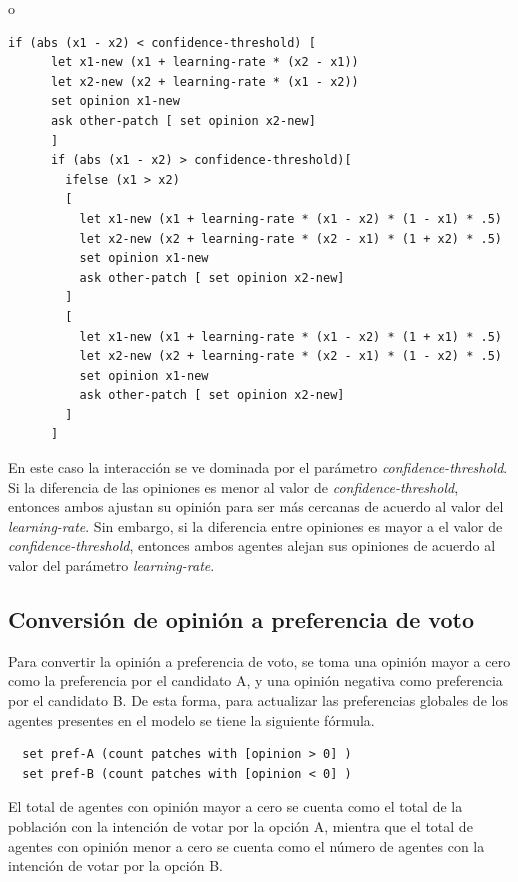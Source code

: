 o \documentclass[11pt, letterpaper]{article}
\begin{document}
\begin{verbatim}
if (abs (x1 - x2) < confidence-threshold) [ 
      let x1-new (x1 + learning-rate * (x2 - x1))
      let x2-new (x2 + learning-rate * (x1 - x2))
      set opinion x1-new
      ask other-patch [ set opinion x2-new]
      ]
      if (abs (x1 - x2) > confidence-threshold)[ 
        ifelse (x1 > x2)
        [
          let x1-new (x1 + learning-rate * (x1 - x2) * (1 - x1) * .5)
          let x2-new (x2 + learning-rate * (x2 - x1) * (1 + x2) * .5)
          set opinion x1-new
          ask other-patch [ set opinion x2-new]
        ]
        [
          let x1-new (x1 + learning-rate * (x1 - x2) * (1 + x1) * .5)
          let x2-new (x2 + learning-rate * (x2 - x1) * (1 - x2) * .5)
          set opinion x1-new
          ask other-patch [ set opinion x2-new]
        ]
      ]
\end{verbatim}

En este caso la interacción se ve dominada por el parámetro
\emph{confidence-threshold}. Si la diferencia de las opiniones es menor
al valor de \emph{confidence-threshold}, entonces ambos ajustan su
opinión para ser más cercanas de acuerdo al valor del
\emph{learning-rate}. Sin embargo, si la diferencia entre opiniones es
mayor a el valor de \emph{confidence-threshold}, entonces ambos agentes
alejan sus opiniones de acuerdo al valor del parámetro
\emph{learning-rate}.

\subsection{Conversión de opinión a preferencia de
voto}\label{conversiuxf3n-de-opiniuxf3n-a-preferencia-de-voto}

Para convertir la opinión a preferencia de voto, se toma una opinión
mayor a cero como la preferencia por el candidato A, y una opinión
negativa como preferencia por el candidato B. De esta forma, para
actualizar las preferencias globales de los agentes presentes en el
modelo se tiene la siguiente fórmula.

\begin{verbatim}
  set pref-A (count patches with [opinion > 0] )
  set pref-B (count patches with [opinion < 0] )
\end{verbatim}

El total de agentes con opinión mayor a cero se cuenta como el total de
la población con la intención de votar por la opción A, mientra que el
total de agentes con opinión menor a cero se cuenta como el número de
agentes con la intención de votar por la opción B.
\end{document}
